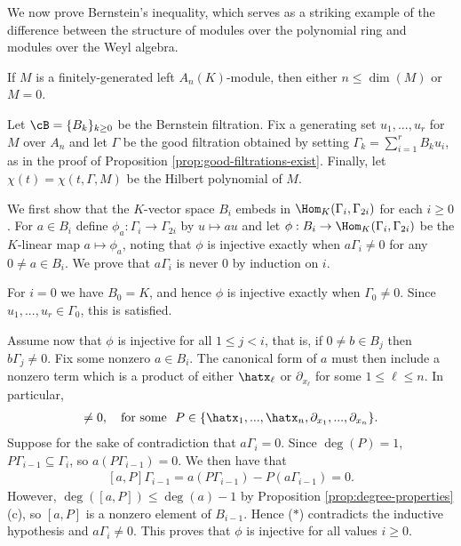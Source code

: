 We now prove Bernstein's inequality, which serves as a striking example of the difference between the structure of modules over the polynomial ring and modules over the Weyl algebra.
\begin{thm}\label{thm:bern-inequality}
	If $M$ is a finitely-generated left $A_n(K)$-module, then either $n \leq \dim(M)$ or $M = 0$.
\end{thm}
\begin{prf}
	Let $\cB = \{B_k\}_{k\geq 0}$ be the Bernstein filtration. Fix a generating set $u_1,...,u_r$ for $M$ over $A_n$ and let $\Gamma$ be the good filtration obtained by setting $\Gamma_k = \sum_{i=1}^r B_ku_i$, as in the proof of Proposition \ref{prop:good-filtrations-exist}. Finally, let $\chi(t) = \chi(t,\Gamma, M)$ be the Hilbert polynomial of $M$.

	We first show that the $K$-vector space $B_i$ embeds in $\Hom_K(\Gamma_i, \Gamma_{2i})$ for each $i \geq 0$. For $a \in B_i$ define $\phi_a:\Gamma_i\to \Gamma_{2i}$ by $u\mapsto au$ and let $\phi:B_i\to \Hom_K(\Gamma_i,\Gamma_{2i})$ be the $K$-linear map $a\mapsto \phi_a$, noting that $\phi$ is injective exactly when $a\Gamma_i \neq 0$ for any $0 \neq a \in B_i$. We prove that $a\Gamma_i$ is never $0$ by induction on $i$.

	For $i = 0$ we have $B_0 = K$, and hence $\phi$ is injective exactly when $\Gamma_0 \neq 0$. Since $u_1,...,u_r \in \Gamma_0$, this is satisfied.

	Assume now that $\phi$ is injective for all $1\leq j <i$, that is, if $0 \neq b \in B_{j}$ then $b\Gamma_j\neq 0$. Fix some nonzero $a \in B_i$. The canonical form of $a$ must then include a nonzero term which is a product of either $\hatx_\ell$ or $\partial_{x_\ell}$ for some $1\leq \ell\leq n$. In particular,
	\begin{align*}
		[a,P] \neq 0, \hspace{1em} \text{for some } ~ P \in \{\hatx_1,...,\hatx_n,\partial_{x_1},...,\partial_{x_n}\}.
	\end{align*}
	Suppose for the sake of contradiction that $a\Gamma_i = 0$. Since $\deg(P) = 1$, $P\Gamma_{i-1} \subseteq \Gamma_{i}$, so $a(P\Gamma_{i-1}) = 0$. We then have that
	\begin{align}\tag{$\ast$}
		[a,P]\Gamma_{i-1} = a(P\Gamma_{i-1}) - P(a\Gamma_{i-1}) = 0.
	\end{align}
	However, $\deg([a,P]) \leq \deg(a) - 1$ by Proposition \ref{prop:degree-properties} (c), so $[a,P]$ is a nonzero element of $B_{i-1}$. Hence ($\ast$) contradicts the inductive hypothesis and $a\Gamma_i \neq 0$. This proves that $\phi$ is injective for all values $i \geq 0$.


\end{prf}
